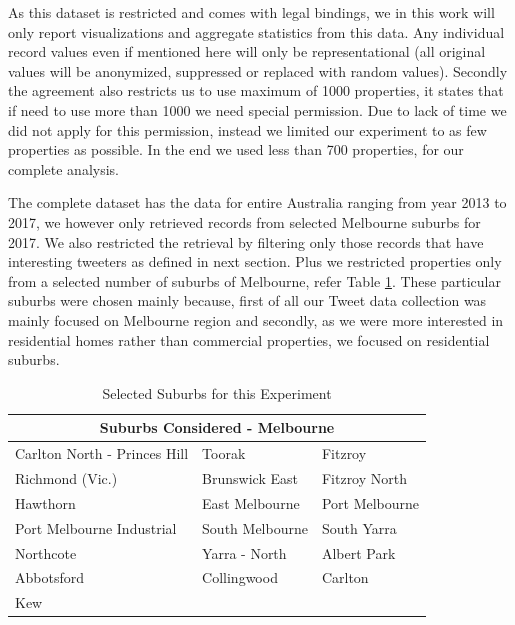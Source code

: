 \documentclass[12pt]{report}
\theoremstyle{named}
\begin{document}
As this dataset is restricted and comes with legal bindings, we in this work will only report visualizations and aggregate statistics from this data. Any individual record values even if mentioned here will only be representational (all original values will be anonymized, suppressed or replaced with random values). Secondly the agreement also restricts us to use maximum of 1000 properties, it states that if need to use more than 1000 we need special permission. Due to lack of time we did not apply for this permission, instead we limited our experiment to as few properties as possible. In the end we used less than 700 properties, for our complete analysis.

The complete dataset has the data for entire Australia ranging from year 2013 to 2017, we however only retrieved records from selected Melbourne suburbs for 2017. We also restricted the retrieval by filtering only those records that have interesting tweeters as defined in next section. Plus we restricted properties only from a selected number of suburbs of Melbourne, refer Table \ref{tab:Suburbs Considered}. These particular suburbs were chosen mainly because, first of all our Tweet data collection was mainly focused on Melbourne region and secondly, as we were more interested in residential homes rather than commercial properties, we focused on residential suburbs.





\begin{table}[ht]
\centering
\begin{tabular}{@{}lll@{}}
\toprule
\multicolumn{3}{c}{\textbf{Suburbs Considered - Melbourne}}                        \\ \midrule
Carlton North - Princes Hill & Toorak          & Fitzroy        \\
Richmond (Vic.)              & Brunswick East  & Fitzroy North  \\
Hawthorn                     & East Melbourne  & Port Melbourne \\
Port Melbourne Industrial    & South Melbourne & South Yarra    \\
Northcote                    & Yarra - North   & Albert Park    \\
Abbotsford                   & Collingwood     & Carlton        \\
Kew                          &                 &                \\ \bottomrule
\end{tabular}
\caption{Selected Suburbs for this Experiment}
\label{tab:Suburbs Considered}
\end{table}
\end{document}
